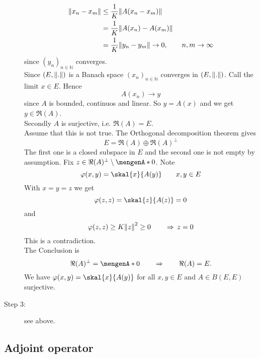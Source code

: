 \begin{beweis}
\begin{description}
		\begin{align*}
			\norm{x_n-x_m} &\leq \frac{1}{K} \norm{A(x_n-x_m)} \\
			&= \frac{1}{K} \norm{A(x_n)- A(x_m)} \\
			&= \frac{1}{K} \norm{y_n -y_m} \to 0, \qquad n,m \to \infty
		\end{align*}
		since $(y_n)_{n \in \mathbb{N}}$ converges. \\
		Since $(E, \norm{.})$ is a Banach space $(x_n)_{n \in \mathbb{N}}$ converges in $(E, \norm{.})$. Call the limit $x \in E$. Hence
		\[
			A(x_n) \to y
		\]
		since $A$ is bounded, continuos and linear. So $y = A(x)$ and we get $y \in \Re(A)$. \\
		Secondly $A$ is surjective, i.e. $\Re(A)=E$. \\
		Assume that this is not true. The Orthogonal decomposition theorem gives
		\[
			E = \Re(A) \oplus \Re(A)^{\perp}
		\]
		The first one is a closed subspace in $E$ and the second one is not empty by assumption. Fix $z \in \Re(A)^{\perp} \setminus \set{0}$. Note 
		\[
			\varphi(x,y) = \skal{x}{A(y)} \qquad x,y \in E
		\]
		With $x = y = z$ we get
		\[
			\varphi(z,z) = \skal{z}{A(z)} = 0
		\]
		and 
		\[
			\varphi(z,z) \geq K \norm{z}^2 \geq 0 \qquad \Rightarrow  \,z=0
		\]
		This is a contradiction. \\
		The Conclusion is 
		\[
			\Re(A)^{\perp} = \set{0} \qquad \Rightarrow \qquad \Re(A) = E.
		\]
		We have $\varphi(x,y) = \skal{x}{A(y)}$ for all $x,y \in E$ and $A \in B(E,E)$ surjective.
		\item[Step 3:] see above.
	\end{description}
\end{beweis}

\subsection{Adjoint operator} 
\label{sub:adjoint_operator}








